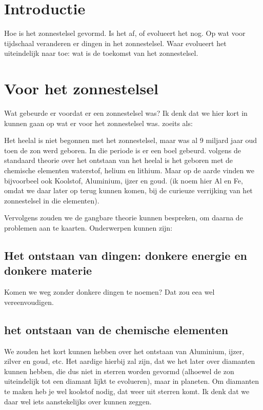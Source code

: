 \documentclass[11pt,fleqn]{book} %
\begin{document}

\pagestyle{fancy} %



\chapter{Introductie}

Hoe is het zonnestelsel gevormd.
Is het af, of evolueert het nog.
Op wat voor tijdschaal veranderen er dingen in het zonnestelsel.
Waar evolueert het uiteindelijk naar toe: wat is de toekomst van het zonnestelsel.

\chapter{Voor het zonnestelsel}

Wat gebeurde er voordat er een zonnestelsel was? Ik denk dat we hier
kort in kunnen gaan op wat er voor het zonnestelsel was. zoeits als:

Het heelal is niet begonnen met het zonnestelsel, maar was al 9
miljard jaar oud toen de zon werd geboren. In die periode is er een
boel gebeurd. volgens de standaard theorie over het ontstaan van het
heelal is het geboren met de chemische elementen waterstof, helium en
lithium. Maar op de aarde vinden we bijvoorbeel ook Koolstof,
Aluminium, ijzer en goud. (ik noem hier Al en Fe, omdat we daar later
op terug kunnen komen, bij de curieuze verrijking van het zonnestelsel
in die elementen).

Vervolgens zouden we de gangbare theorie kunnen bespreken, om daarna de problemen aan te kaarten.
Onderwerpen kunnen zijn:
\section{Het ontstaan van dingen: donkere energie en donkere materie}
Komen we weg zonder donkere dingen te noemen? Dat zou eea wel vereenvoudigen.

\section{het ontstaan van de chemische elementen}
We zouden het kort kunnen hebben over het ontstaan van Aluminium,
ijzer, zilver en goud, etc.  Het aardige hierbij zal zijn, dat we het
later over diamanten kunnen hebben, die dus niet in sterren worden
gevormd (alhoewel de zon uiteindelijk tot een diamant lijkt te
evolueren), maar in planeten. Om diamanten te maken heb je wel
koolstof nodig, dat weer uit sterren komt. Ik denk dat we daar wel
iets aanstekelijks over kunnen zeggen.
\end{document}
